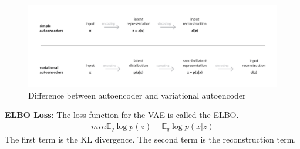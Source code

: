 \documentclass[11pt]{article}
\theoremstyle{definition}
\theoremstyle{theorem}
\begin{document}
\begin{figure}
  \includegraphics[width=\linewidth]{vaes.png}
  \caption{Difference between autoencoder and variational autoencoder}
  \label{fig:aevsvae}
\end{figure}

\textbf{ELBO Loss}: 
The loss function for the VAE is called the ELBO.
\begin{align*} min \mathbb{E}_{q}\log p(z)- \mathbb{E}_{q}\log p(x|z)\end{align*} The first term is the KL divergence. The second term is the reconstruction term.

\end{document}
